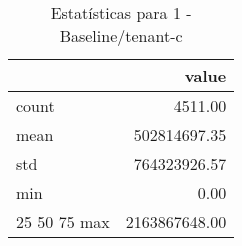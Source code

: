 \begin{table}[htbp]
\caption{Estatísticas para 1 - Baseline/tenant-c}
\label{tab:1_-_baseline_tenant-c_summary}
\begin{tabular}{lr}
\toprule
 & value \\
\midrule
count & 4511.00 \\
mean & 502814697.35 \\
std & 764323926.57 \\
min & 0.00 \\
25%
50%
75%
max & 2163867648.00 \\
\bottomrule
\end{tabular}
\end{table}
